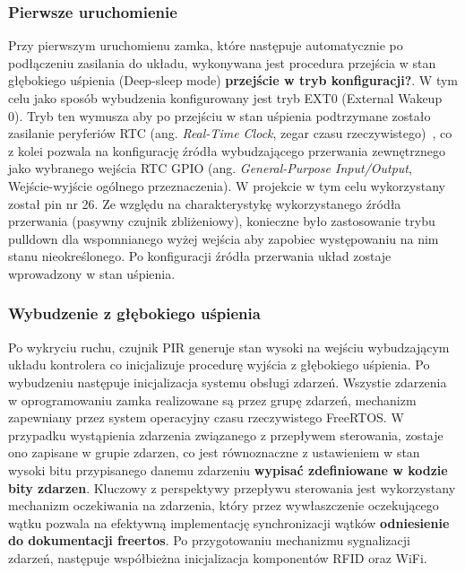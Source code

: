             \subsubsection{Pierwsze uruchomienie}

                Przy pierwszym uruchomienu zamka, które następuje automatycznie po podłączeniu zasilania do układu, wykonywana jest procedura przejścia w stan głębokiego uśpienia (Deep-sleep mode) \textbf{przejście w tryb konfiguracji?}. W tym celu jako sposób wybudzenia konfigurowany jest tryb EXT0 (External Wakeup 0). Tryb ten wymusza aby po przejściu w stan uśpienia podtrzymane zostało zasilanie peryferiów RTC (ang. \textit{Real-Time Clock}, zegar czasu rzeczywistego)~\cite{esp32-api-ref}, co z kolei pozwala na konfigurację źródła wybudzającego przerwania zewnętrznego jako wybranego wejścia RTC GPIO (ang. \textit{General-Purpose Input/Output}, Wejście-wyjście ogólnego przeznaczenia). W projekcie w tym celu wykorzystany został pin nr 26. Ze względu na charakterystykę wykorzystanego źródła przerwania (pasywny czujnik zbliżeniowy), konieczne było zastosowanie trybu pulldown dla wspomnianego wyżej wejścia aby zapobiec występowaniu na nim stanu nieokreślonego. Po konfiguracji źródła przerwania układ zostaje wprowadzony w stan uśpienia.

            \subsubsection{Wybudzenie z głębokiego uśpienia}

                Po wykryciu ruchu, czujnik PIR generuje stan wysoki na wejściu wybudzającym układu kontrolera co inicjalizuje procedurę wyjścia z głębokiego uśpienia. Po wybudzeniu następuje inicjalizacja systemu obsługi zdarzeń. Wszystie zdarzenia w oprogramowaniu zamka realizowane są przez grupę zdarzeń, mechanizm zapewniany przez system operacyjny czasu rzeczywistego FreeRTOS. W przypadku wystąpienia zdarzenia związanego z przepływem sterowania, zostaje ono zapisane w grupie zdarzen, co jest równoznaczne z ustawieniem w stan wysoki bitu przypisanego danemu zdarzeniu \textbf{wypisać zdefiniowane w kodzie bity zdarzen}. Kluczowy z perspektywy przepływu sterowania jest wykorzystany mechanizm oczekiwania na zdarzenia, który przez wywłaszczenie oczekującego wątku pozwala na efektywną implementację synchronizacji wątków \textbf{odniesienie do dokumentacji freertos}. Po przygotowaniu mechanizmu sygnalizacji zdarzeń, następuje współbieżna inicjalizacja komponentów RFID oraz WiFi.


